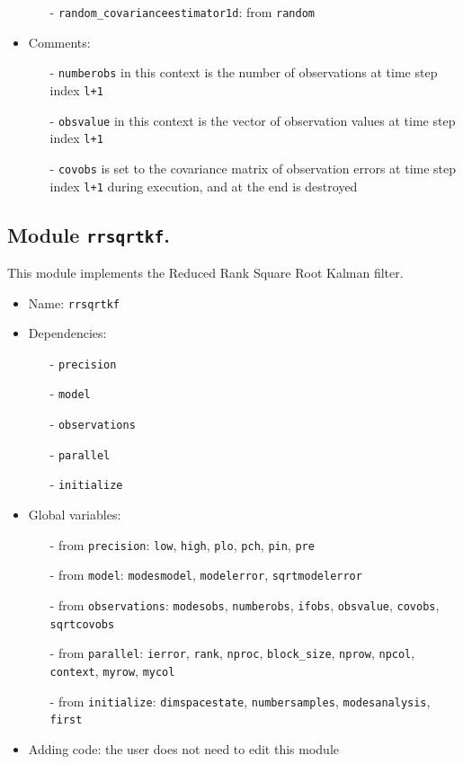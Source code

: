 \documentclass[12pt]{article}
\begin{document}
\begin{itemize}
\begin{itemize}
\item[-] {\tt random\_covarianceestimator1d}: from {\tt random} 
\end{itemize}
\item Comments: 
\begin{itemize}
\item[-] {\tt numberobs} in this context is the number of observations at time step index {\tt l+1} 
\item[-] {\tt obsvalue} in this context is the vector of observation values at time step index {\tt l+1}
\item[-] {\tt covobs} is set to the covariance matrix of observation errors at time step index {\tt l+1} during execution, and at the end is destroyed 
\end{itemize}
\end{itemize} 

\subsection{Module {\tt rrsqrtkf}.} 
This module implements the Reduced Rank Square Root Kalman filter.
\begin{itemize}
\item Name: {\tt rrsqrtkf}
\item Dependencies: 
\begin{itemize}
\item[-] {\tt precision}
\item[-] {\tt model}
\item[-] {\tt observations}
\item[-] {\tt parallel}
\item[-] {\tt initialize}
\end{itemize}
\item Global variables: 
\begin{itemize}
\item[-] from {\tt precision}: {\tt low}, {\tt high}, {\tt plo}, {\tt pch}, {\tt pin}, {\tt pre} 
\item[-] from {\tt model}: {\tt modesmodel}, {\tt modelerror}, {\tt sqrtmodelerror}
\item[-] from {\tt observations}: {\tt modesobs}, {\tt numberobs}, {\tt ifobs}, {\tt obsvalue}, {\tt covobs}, {\tt sqrtcovobs}
\item[-] from {\tt parallel}: {\tt ierror}, {\tt rank}, {\tt nproc}, {\tt block\_size}, {\tt nprow}, {\tt npcol}, {\tt context}, {\tt myrow}, {\tt mycol}
\item[-] from {\tt initialize}: {\tt dimspacestate}, {\tt numbersamples}, {\tt modesanalysis}, {\tt first}
\end{itemize}
\item Adding code: the user does not need to edit this module
\end{itemize}
\end{document}
